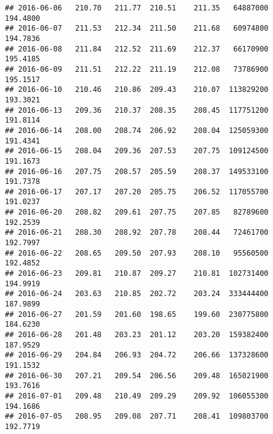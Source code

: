 \documentclass[
]{article}
\begin{document}
\begin{verbatim}
## 2016-06-06   210.70   211.77  210.51    211.35   64887000     194.4800
## 2016-06-07   211.53   212.34  211.50    211.68   60974800     194.7836
## 2016-06-08   211.84   212.52  211.69    212.37   66170900     195.4185
## 2016-06-09   211.51   212.22  211.19    212.08   73786900     195.1517
## 2016-06-10   210.46   210.86  209.43    210.07  113829200     193.3021
## 2016-06-13   209.36   210.37  208.35    208.45  117751200     191.8114
## 2016-06-14   208.00   208.74  206.92    208.04  125059300     191.4341
## 2016-06-15   208.04   209.36  207.53    207.75  109124500     191.1673
## 2016-06-16   207.75   208.57  205.59    208.37  149533100     191.7378
## 2016-06-17   207.17   207.20  205.75    206.52  117055700     191.0237
## 2016-06-20   208.82   209.61  207.75    207.85   82789600     192.2539
## 2016-06-21   208.30   208.92  207.78    208.44   72461700     192.7997
## 2016-06-22   208.65   209.50  207.93    208.10   95560500     192.4852
## 2016-06-23   209.81   210.87  209.27    210.81  102731400     194.9919
## 2016-06-24   203.63   210.85  202.72    203.24  333444400     187.9899
## 2016-06-27   201.59   201.60  198.65    199.60  230775800     184.6230
## 2016-06-28   201.48   203.23  201.12    203.20  159382400     187.9529
## 2016-06-29   204.84   206.93  204.72    206.66  137328600     191.1532
## 2016-06-30   207.21   209.54  206.56    209.48  165021900     193.7616
## 2016-07-01   209.48   210.49  209.29    209.92  106055300     194.1686
## 2016-07-05   208.95   209.08  207.71    208.41  109803700     192.7719
## 2016-07-06   207.83   209.80  207.06    209.66   96021500     193.9281
## 2016-07-07   209.87   210.65  208.63    209.53   85593800     193.8079
## 2016-07-08   211.05   212.94  210.78    212.65  133971000     196.6937
## 2016-07-11   213.19   214.07  212.95    213.40   73633900     197.3875
## 2016-07-12   214.53   215.30  213.43    214.95  101275600     198.8212
## 2016-07-13   215.44   215.45  214.35    214.92   87324100     198.7934
## 2016-07-14   216.40   216.67  215.66    216.12   91230900     199.9034
## 2016-07-15   216.78   217.01  215.31    215.83  107155400     199.6352
## 2016-07-18   215.97   216.60  215.67    216.41   58725900     200.1716
## 2016-07-19   215.92   216.23  215.63    216.19   54345700     199.9681
## 2016-07-20   216.19   217.37  216.19    217.09   58159500     200.8006
## 2016-07-21   216.96   217.22  215.75    216.27   67777300     200.0422
## 2016-07-22   216.41   217.30  216.10    217.24   62787500     200.9394
## 2016-07-25   217.00   217.06  215.97    216.65   55873100     200.3936
## 2016-07-26   216.53   217.17  215.76    216.75   70080500     200.4861

\end{verbatim}
\end{document}
